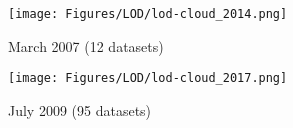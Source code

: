 \vspace{5cm}
\begin{figure}
\centering
{}
\begin{minipage}{.5\textwidth}
  \centering
  \texttt{[image: Figures/LOD/lod-cloud\_2014.png]}
  \caption*{March 2007 (12 datasets)}
  \label{fig:test1}
\end{minipage}%
\begin{minipage}{.5\textwidth}
  \centering
  \texttt{[image: Figures/LOD/lod-cloud\_2017.png]}
  \caption*{July 2009 (95 datasets)}
  \label{fig:test2}
\end{minipage}
\end{figure}


